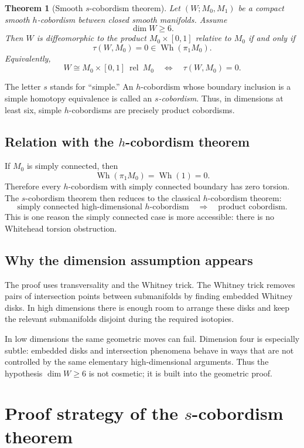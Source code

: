 \documentclass[11pt,a4paper]{article}
\newcommand{\Wh}{\operatorname{Wh}}
\newcommand{\rel}{\operatorname{rel}}
\theoremstyle{definition}
\theoremstyle{plain}
\newtheorem{theorem}[definition]{Theorem}
\theoremstyle{remark}
\begin{document}
\begin{theorem}[Smooth \(s\)-cobordism theorem]
Let \((W;M_0,M_1)\) be a compact smooth \(h\)-cobordism between closed smooth manifolds. Assume
\[
  \dim W\ge 6.
\]
Then \(W\) is diffeomorphic to the product \(M_0\times[0,1]\) relative to \(M_0\) if and only if
\[
  \tau(W,M_0)=0\in \Wh(\pi_1M_0).
\]
Equivalently,
\[
  W\cong M_0\times[0,1]\ \rel\ M_0
  \quad\Longleftrightarrow\quad
  \tau(W,M_0)=0.
\]
\end{theorem}

The letter \(s\) stands for ``simple.'' An \(h\)-cobordism whose boundary inclusion is a simple homotopy equivalence is called an \emph{\(s\)-cobordism}. Thus, in dimensions at least six, simple \(h\)-cobordisms are precisely product cobordisms.

\subsection{Relation with the \texorpdfstring{\(h\)}{h}-cobordism theorem}

If \(M_0\) is simply connected, then
\[
  \Wh(\pi_1M_0)=\Wh(1)=0.
\]
Therefore every \(h\)-cobordism with simply connected boundary has zero torsion. The \(s\)-cobordism theorem then reduces to the classical \(h\)-cobordism theorem:
\[
  \text{simply connected high-dimensional \(h\)-cobordism}
  \quad\Longrightarrow\quad
  \text{product cobordism}.
\]
This is one reason the simply connected case is more accessible: there is no Whitehead torsion obstruction.

\subsection{Why the dimension assumption appears}

The proof uses transversality and the Whitney trick. The Whitney trick removes pairs of intersection points between submanifolds by finding embedded Whitney disks. In high dimensions there is enough room to arrange these disks and keep the relevant submanifolds disjoint during the required isotopies.

In low dimensions the same geometric moves can fail. Dimension four is especially subtle: embedded disks and intersection phenomena behave in ways that are not controlled by the same elementary high-dimensional arguments. Thus the hypothesis \(\dim W\ge 6\) is not cosmetic; it is built into the geometric proof.

\section{Proof strategy of the \texorpdfstring{\(s\)}{s}-cobordism theorem}
\end{document}
